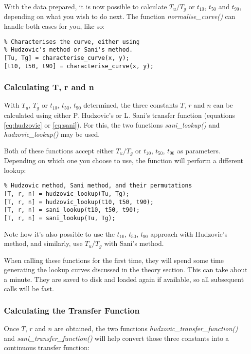With the data prepared, it is  now  possible to calculate $T_u/T_g$ or $t_{10}$,
$t_{50}$ and $t_{90}$, depending on what you  wish  to  do  next.  The  function
\textit{normalise\_curve()}  can  handle  both   cases   for   you,   like   so:

\begin{lstlisting}
% Characterises the curve, either using
% Hudzovic's method or Sani's method.
[Tu, Tg] = characterise_curve(x, y);
[t10, t50, t90] = characterise_curve(x, y);
\end{lstlisting}


\subsubsection*{Calculating T, r and n}

With  $T_u$,  $T_g$  or  $t_{10}$,  $t_{50}$,  $t_{90}$  determined,  the  three
constants $T$, $r$ and $n$ can be calculated using  either  P.  Hudzovic's or L.
Sani's  transfer function (equations \ref{eq:hudzovic}  or  \ref{eq:sani}).  For
this, the two functions  \textit{sani\_lookup()} and \textit{hudzovic\_lookup()}
may be used.

Both  of these functions accept either $T_u/T_g$ or $t_{10}$, $t_{50}$, $t_{90}$
as parameters. Depending  on  which  one  you  choose  to use, the function will
perform a different lookup:

\begin{lstlisting}
% Hudzovic method, Sani method, and their permutations
[T, r, n] = hudzovic_lookup(Tu, Tg);
[T, r, n] = hudzovic_lookup(t10, t50, t90);
[T, r, n] = sani_lookup(t10, t50, t90);
[T, r, n] = sani_lookup(Tu, Tg);
\end{lstlisting}

Note how it's  also  possible  to  use the $t_{10}$, $t_{50}$, $t_{90}$ approach
with  Hudzovic's method,  and  similarly,  use  $T_u/T_g$  with  Sani's  method.

When  calling  these  functions  for  the  first time, they will spend some time
generating  the  lookup  curves  discussed in the theory section. This can  take
about a minute. They are saved to  disk  and  loaded  again if available, so all
subsequent calls will be fast.


\subsubsection*{Calculating the Transfer Function}

Once    $T$,    $r$    and    $n$    are    obtained,    the    two    functions
\textit{hudzovic\_transfer\_function()}  and \textit{sani\_transfer\_function()}
will help  convert  those  three  constants into a continuous transfer function:

